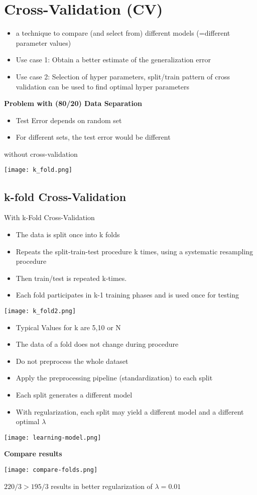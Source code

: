 \section{Cross-Validation (CV)}

\begin{itemize}
    \item a technique to compare (and select from) different models (=different parameter values)
    \item Use case 1: Obtain a better estimate of the generalization error
    \item Use case 2: Selection of hyper parameters, split/train pattern of cross validation can be used to find optimal hyper parameters
\end{itemize}

\textbf{Problem with (80/20) Data Separation}
\begin{itemize}
    \item Test Error depends on random set
    \item For different sets, the test error would be different
\end{itemize}

without cross-validation

\texttt{[image: k\_fold.png]}

\subsection{k-fold Cross-Validation}

With k-Fold Cross-Validation\\

\begin{itemize}
    \item The data is split once into k folds
    \item Repeats the split-train-test procedure k times, using a systematic resampling procedure
    \item Then train/test is repeated k-times.
    \item Each fold participates in k-1 training phases and is used once for testing
\end{itemize}

\texttt{[image: k\_fold2.png]}

\begin{itemize}
    \item Typical Values for k are 5,10 or N
    \item The data of a fold does not change during procedure
    \item Do not preprocess the whole dataset
    \item Apply the preprocessing pipeline (standardization) to each split
    \item Each split generates a different model
    \item With regularization, each split may yield a different  model and a different optimal $\lambda$
\end{itemize}

\texttt{[image: learning-model.png]}

\textbf{Compare results}

\texttt{[image: compare-folds.png]}

$220/3 > 195/3$ results in better regularization of $\lambda = 0.01$
